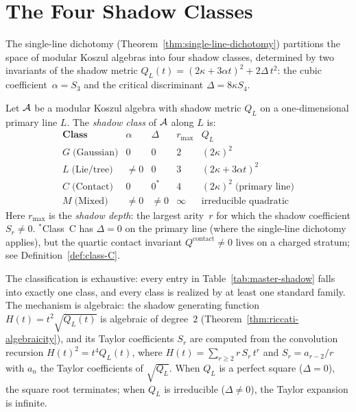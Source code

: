 

\section{The Four Shadow Classes}\label{sec:four-classes}

The single-line dichotomy (Theorem~\ref{thm:single-line-dichotomy})
partitions the space of modular Koszul algebras into four shadow classes,
determined by two invariants of the shadow metric
$Q_L(t) = (2\kappa + 3\alpha t)^2 + 2\Delta\, t^2$:
the cubic coefficient~$\alpha = S_3$ and the critical
discriminant $\Delta = 8\kappa S_4$.

\begin{definition}\label{def:shadow-classes}
Let $\mathcal{A}$ be a modular Koszul algebra with shadow metric $Q_L$ on a
one-dimensional primary line $L$. The \emph{shadow class} of $\mathcal{A}$
along $L$ is:
\[
\renewcommand{\arraystretch}{1.4}
\begin{array}{c|cc|cc}
\textbf{Class} & \alpha & \Delta & r_{\max} & Q_L \\
\hline
G\;\text{(Gaussian)} & 0 & 0 & 2 & (2\kappa)^2 \\
L\;\text{(Lie/tree)} & \neq 0 & 0 & 3 & (2\kappa + 3\alpha t)^2 \\
C\;\text{(Contact)} & 0 & 0^* & 4 & (2\kappa)^2\;\text{(primary line)} \\
M\;\text{(Mixed)} & \neq 0 & \neq 0 & \infty & \text{irreducible quadratic}
\end{array}
\]
Here $r_{\max}$ is the \emph{shadow depth}: the largest arity~$r$
for which the shadow coefficient $S_r \neq 0$.
${}^*$Class~C has $\Delta = 0$ on the primary line (where
the single-line dichotomy applies), but the quartic contact
invariant $Q^{\mathrm{contact}} \neq 0$ lives on a charged
stratum; see Definition~\ref{def:class-C}.
\end{definition}

The classification is exhaustive: every entry in Table~\ref{tab:master-shadow}
falls into exactly one class, and every class is realized by at least
one standard family. The mechanism is algebraic: the shadow generating
function $H(t) = t^2\sqrt{Q_L(t)}$ is algebraic of degree~$2$
(Theorem~\ref{thm:riccati-algebraicity}), and its Taylor coefficients
$S_r$ are computed from the convolution recursion
$H(t)^2 = t^4 Q_L(t)$, where $H(t) = \sum_{r \geq 2} r\, S_r\, t^r$
and $S_r = a_{r-2}/r$ with $a_n$ the Taylor coefficients of $\sqrt{Q_L}$.
When $Q_L$ is a perfect square ($\Delta = 0$), the square root
terminates; when $Q_L$ is irreducible ($\Delta \neq 0$), the Taylor
expansion is infinite.

